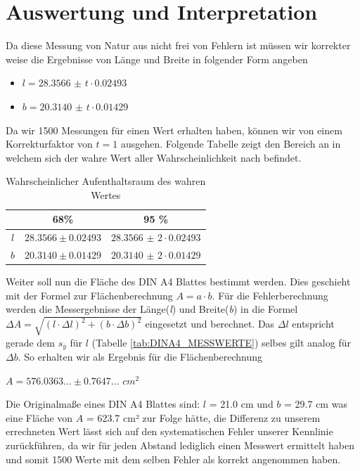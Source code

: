 \documentclass[12pt,oneside,a4paper]{report}
\begin{document}
\section{Auswertung und Interpretation}
\label{chap:VERSUCH_3_AUSWERTUNG}
Da diese Messung von Natur aus nicht frei von Fehlern ist müssen wir korrekter weise die Ergebnisse von Länge und Breite in folgender Form angeben
\begin{itemize}
\centering
\item $l = 28.3566$ $\pm$ $t \cdot 0.02493$ 
\item $b = 20.3140$ $\pm$ $t \cdot 0.01429$ 
\end{itemize}
Da wir 1500 Messungen für einen Wert erhalten haben, können wir von einem Korrekturfaktor von $t = 1$ ausgehen. 
Folgende Tabelle zeigt den Bereich an in welchem sich der wahre Wert aller Wahrscheinlichkeit nach befindet.
\begin{table}[H]
\centering
\begin{tabular}{c|cc}
  & 68\% & 95 \% \\ 
  \hline
 $l$ & $28.3566\pm0.02493$ & $28.3566$ $\pm$ $2 \cdot 0.02493$  \\ 
 $b$ & $20.3140\pm0.01429$  & $20.3140$ $\pm$ $2 \cdot 0.01429$  \\ 
\end{tabular} 
\caption{Wahrscheinlicher Aufenthaltsraum des wahren Wertes}
\label{tab:GAUSVERTEILUNG ERGEBNIS}
\end{table}

Weiter soll nun die Fläche des DIN A4 Blattes bestimmt werden. Dies geschieht mit der Formel zur Flächenberechnung $A = a \cdot b$. Für die Fehlerberechnung werden die Messergebnisse der Länge(\textit{l}) und Breite(\textit{b}) in die Formel $\Delta A = \sqrt{(l \cdot \Delta l)^2 + (b \cdot \Delta b)^2}$ eingesetzt und berechnet. Das $\Delta l$ entspricht gerade dem $s_{\bar{y}}$ für $l$ (Tabelle \ref{tab:DINA4_MESSWERTE}) selbes gilt analog für $\Delta b$. So erhalten wir als Ergebnis für die Flächenberechnung

\begin{center}
$A = 576.0363... \pm 0.7647...$ $cm^2$
\end{center}

Die Originalmaße eines DIN A4 Blattes sind: $l$ = 21.0 cm  und $b$ = 29.7 cm was eine Fläche von $A$ = 623.7 cm² zur Folge hätte, die Differenz zu unserem errechneten Wert lässt sich auf den systematischen Fehler unserer Kennlinie zurückführen, da wir für jeden Abstand lediglich einen Messwert ermittelt haben und somit 1500 Werte mit dem selben Fehler als korrekt angenommen haben. 
\end{document}
